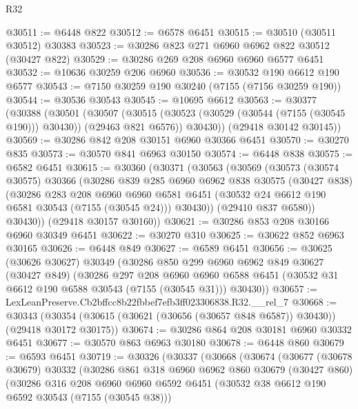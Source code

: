 \begin{lexlean}{R32}
\begin{coremodule}
@30511 := @6448 @822
@30512 := @6578 @6451
@30515 := @30510 (@30511 @30512) @30383
@30523 := @30286 @823 @271 @6960 @6962 @822 @30512 (@30427 @822)
@30529 := @30286 @269 @208 @6960 @6960 @6577 @6451
@30532 := @10636 @30259 @206 @6960
@30536 := @30532 @190 @6612 @190 @6577
@30543 := @7150 @30259 @190 @30240 (@7155 (@7156 @30259 @190))
@30544 := @30536 @30543
@30545 := @10695 @6612
@30563 := @30377
    (@30388
      (@30501
        (@30507
          (@30515 (@30523 (@30529 (@30544 (@7155 (@30545 @190))) @30430)) (@29463 @821 @6576))
          @30430))
      (@29418 @30142 @30145))
@30569 := @30286 @842 @208 @30151 @6960 @30366 @6451
@30570 := @30270 @835
@30573 := @30570 @841 @6963 @30150
@30574 := @6448 @838
@30575 := @6582 @6451
@30615 := @30360
    (@30371
      (@30563
        (@30569
          (@30573
            (@30574 @30575)
            @30366
            (@30286
              @839
              @285
              @6960
              @6962
              @838
              @30575
              (@30427 @838)
              (@30286
                @283
                @208
                @6960
                @6960
                @6581
                @6451
                (@30532 @24 @6612 @190 @6581 @30543 (@7155 (@30545 @24)))
                @30430))
            (@29410 @837 @6580))
          @30430))
      (@29418 @30157 @30160))
@30621 := @30286 @853 @208 @30166 @6960 @30349 @6451
@30622 := @30270 @310
@30625 := @30622 @852 @6963 @30165
@30626 := @6448 @849
@30627 := @6589 @6451
@30656 := @30625
    (@30626 @30627)
    @30349
    (@30286
      @850
      @299
      @6960
      @6962
      @849
      @30627
      (@30427 @849)
      (@30286
        @297
        @208
        @6960
        @6960
        @6588
        @6451
        (@30532 @31 @6612 @190 @6588 @30543 (@7155 (@30545 @31)))
        @30430))
@30657 := LexLeanPreserve.Cb2bffcc8b22fbbef7efb3ff023306838.R32.__rel_7
@30668 := @30343
    (@30354 (@30615 (@30621 (@30656 (@30657 @848 @6587)) @30430)) (@29418 @30172 @30175))
@30674 := @30286 @864 @208 @30181 @6960 @30332 @6451
@30677 := @30570 @863 @6963 @30180
@30678 := @6448 @860
@30679 := @6593 @6451
@30719 := @30326
    (@30337
      (@30668
        (@30674
          (@30677
            (@30678 @30679)
            @30332
            (@30286
              @861
              @318
              @6960
              @6962
              @860
              @30679
              (@30427 @860)
              (@30286
                @316
                @208
                @6960
                @6960
                @6592
                @6451
                (@30532 @38 @6612 @190 @6592 @30543 (@7155 (@30545 @38)))

\end{coremodule}
\end{lexlean}
